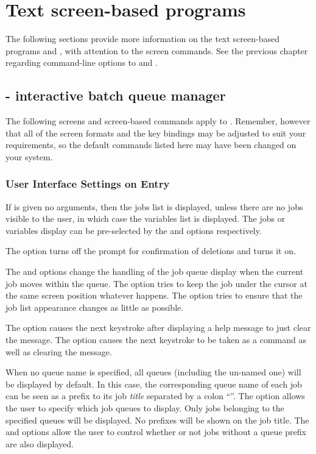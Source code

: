 \chapter{Text screen-based programs}
\label{chp:text-screen-based-programs}
The following sections provide more information on the text screen-based
programs \PrBtq{} and \PrBtuser{}, with attention to the screen commands. See the previous chapter
regarding command-line options to \PrBtq{} and \PrBtuser{}.

\section{\BtqName{} - interactive batch queue manager}
\label{bkm:Btqdescr}The following screens and screen-based commands
apply to \PrBtq{}. Remember, however that all of the
screen formats and the key bindings may be adjusted to suit your
requirements, so the default commands listed here may have been changed
on your system.

\subsection{User Interface Settings on Entry}
If \PrBtq{} is given no arguments, then the jobs list is displayed, unless there are no jobs visible to the user, in which
case the variables list is displayed. The jobs or variables display can be pre-selected by the  and
 options respectively.

The  option turns off the prompt for confirmation of deletions and  turns it on.

The  and  options change the handling of the job queue display when the current job moves
within the queue. The  option tries to keep the job under the cursor at the same screen position whatever happens.
The  option tries to ensure that the job list appearance changes as little as possible.

The  option causes the next keystroke after displaying a help message to just clear the message. The
 option causes the next keystroke to be taken as a command as well as clearing the message.

When no queue name is specified, all queues (including the un-named one) will be displayed by default. In this case, the corresponding queue
name of each job can be seen as a prefix to its job \textit{title} separated by a colon ``\exampletext{:}''. The
 option allows the user to specify which job queues to display. Only jobs belonging to the specified queues will be
displayed. No prefixes will be shown on the job title. The  and  options
allow the user to control whether or not jobs without a queue prefix are also displayed.

